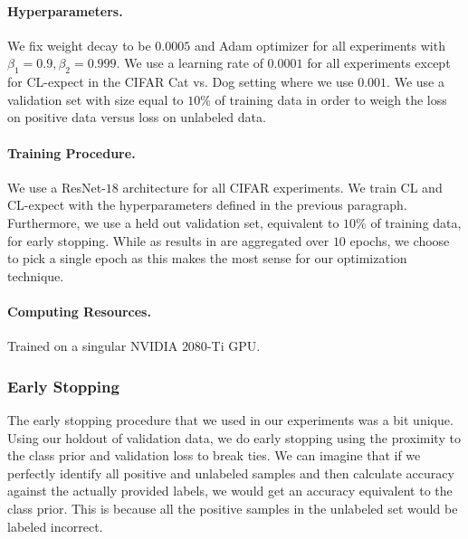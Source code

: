 \documentclass{article}
\begin{document}
\paragraph{Hyperparameters.} We fix weight decay to be $0.0005$ and Adam optimizer for all experiments with $\beta_1 = 0.9, \beta_2 = 0.999$. We use a learning rate of $0.0001$ for all experiments except for CL-expect in the CIFAR Cat vs. Dog setting where we use $0.001$. We use a validation set with size equal to $10\%$ of training data in order to weigh the loss on positive data versus loss on unlabeled data.

\paragraph{Training Procedure.} We use a ResNet-$18$ architecture for all CIFAR experiments. We train CL and CL-expect with the hyperparameters defined in the previous paragraph. Furthermore, we use a held out validation set, equivalent to $10\%$ of training data, for early stopping. While as results in \citet{garg2021mixture} are aggregated over $10$ epochs, we choose to pick a single epoch as this makes the most sense for our optimization technique. 

\paragraph{Computing Resources.} Trained on a singular NVIDIA $2080$-Ti GPU.

\subsubsection{Early Stopping}
The early stopping procedure that we used in our experiments was a bit unique. Using our holdout of validation data, we do early stopping using the proximity to the class prior and validation loss to break ties. We can imagine that if we perfectly identify all positive and unlabeled samples and then calculate accuracy against the actually provided labels, we would get an accuracy equivalent to the class prior. This is because all the positive samples in the unlabeled set would be labeled incorrect. 
\end{document}
